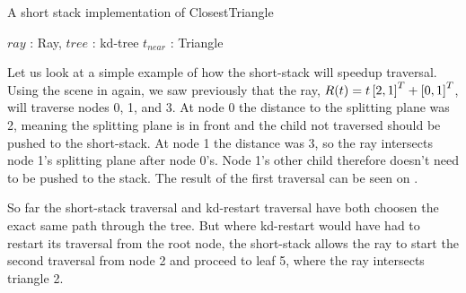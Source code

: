 \begin{algorithm}
  \caption{A short stack implementation of ClosestTriangle}
  \label{alg:ShortStack}
  \begin{algorithmic}
              {$ray$ : Ray, $tree$ : kd-tree}
              {$t_{near}$ : Triangle}{
      \ELSE
      \ENDIF
          \ENDIF
        \ELSE
        \ENDIF
      \ENDWHILE
      \ELSE
      \ENDIF
    \ENDWHILE
              }
  \end{algorithmic}
\end{algorithm}


Let us look at a simple example of how the short-stack will speedup
traversal. Using the scene in  again, we saw
previously that the ray, $R(t) = t \left[2, 1 \right]^T + \left[0, 1 \right]^T$, will
traverse nodes 0, 1, and 3. At node 0 the distance to the splitting plane was 2,
meaning the splitting plane is in front and the child not traversed should be
pushed to the short-stack. At node 1 the distance was 3, so the ray intersects
node 1's splitting plane after node 0's. Node 1's other child therefore doesn't
need to be pushed to the stack. The result of the first traversal can be seen on
.

So far the short-stack traversal and kd-restart traversal have both choosen the
exact same path through the tree. But where kd-restart would have had to restart
its traversal from the root node, the short-stack allows the ray to start the
second traversal from node 2 and proceed to leaf 5, where the ray intersects
triangle 2.

